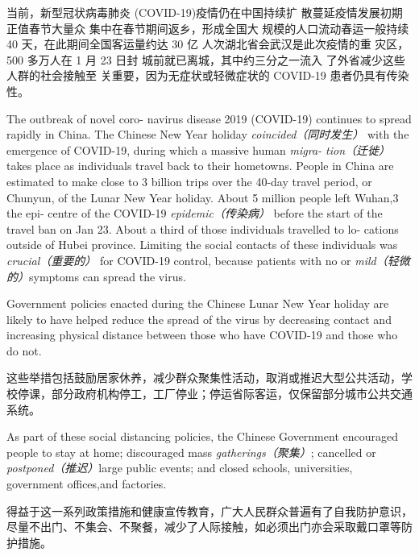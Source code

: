 \begin{multicols}{3}

当前，新型冠状病毒肺炎 (COVID-19)疫情仍在中国持续扩 散蔓延疫情发展初期正值春节大量众 集中在春节期间返乡，形成全国大 规模的人口流动春运一般持续 40 天，在此期间全国客运量约达 30 亿 人次湖北省会武汉是此次疫情的重 灾区，500 多万人在 1 月 23 日封 城前就已离城，其中约三分之一流入 了外省减少这些人群的社会接触至 关重要，因为无症状或轻微症状的 COVID-19 患者仍具有传染性。 

The outbreak of novel coro- navirus disease 2019 (COVID-19) continues to spread rapidly in China. The Chinese New Year holiday \textit{coincided（同时发生）} with the emergence of COVID-19, during which a massive human \textit{migra- tion（迁徙） }takes place as individuals travel back to their hometowns. People in China are estimated to make close to 3 billion trips over the 40-day travel period, or Chunyun, of the Lunar New Year holiday. About 5 million people left Wuhan,3 the epi- centre of the COVID-19 \textit{epidemic（传染病）} before the start of the travel ban on Jan 23. About a third of those individuals travelled to lo- cations outside of Hubei province. Limiting the social contacts of these individuals was \textit{crucial（重要的）} for COVID-19 control, because patients with no or\textit{ mild（轻微的）}symptoms can spread the virus. 


Government policies enacted during the Chinese Lunar New Year holiday are likely to have helped reduce the spread of the virus by decreasing contact and increasing physical distance between those who have COVID-19 and those who do not. 

这些举措包括鼓励居家休养，减少群众聚集性活动，取消或推迟大型公共活动，学校停课，部分政府机构停工，工厂停业；停运省际客运，仅保留部分城市公共交通系统。

As part of these social distancing policies, the Chinese Government encouraged people to stay at home; discouraged mass \textit{gatherings（聚集）}; cancelled or \textit{postponed（推迟）}large public events; and closed schools, universities, government offices,and factories.

得益于这一系列政策措施和健康宣传教育，广大人民群众普遍有了自我防护意识，尽量不出门、不集会、不聚餐，减少了人际接触，如必须出门亦会采取戴口罩等防护措施。


\end{multicols}
